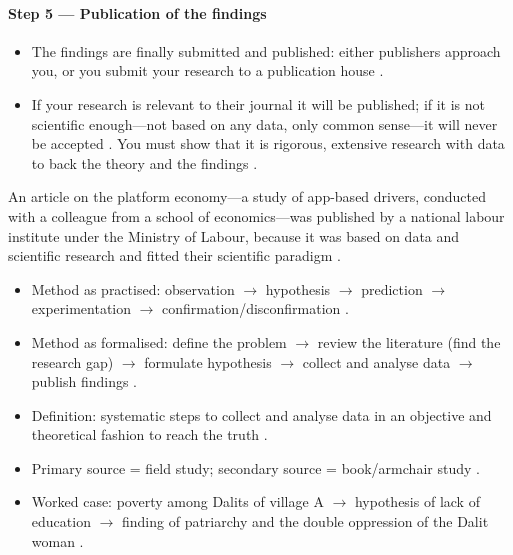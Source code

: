 \paragraph{Step 5 --- Publication of the findings}
\begin{itemize}
    \item The findings are finally submitted and published: either publishers approach you, or you submit your research to a publication house .
    \item If your research is relevant to their journal it will be published; if it is not scientific enough---not based on any data, only common sense---it will never be accepted . You must show that it is rigorous, extensive research with data to back the theory and the findings .
\end{itemize}

\begin{ExampleBox}
An article on the platform economy---a study of app-based drivers, conducted with a colleague from a school of economics---was published by a national labour institute under the Ministry of Labour, because it was based on data and scientific research and fitted their scientific paradigm .
\end{ExampleBox}

\begin{QuickRevision}
\begin{itemize}
    \item Method as practised: observation $\rightarrow$ hypothesis $\rightarrow$ prediction $\rightarrow$ experimentation $\rightarrow$ confirmation/disconfirmation .
    \item Method as formalised: define the problem $\rightarrow$ review the literature (find the research gap) $\rightarrow$ formulate hypothesis $\rightarrow$ collect and analyse data $\rightarrow$ publish findings .
    \item Definition: systematic steps to collect and analyse data in an objective and theoretical fashion to reach the truth .
    \item Primary source = field study; secondary source = book/armchair study .
    \item Worked case: poverty among Dalits of village A $\rightarrow$ hypothesis of lack of education $\rightarrow$ finding of patriarchy and the double oppression of the Dalit woman .
\end{itemize}
\end{QuickRevision}

